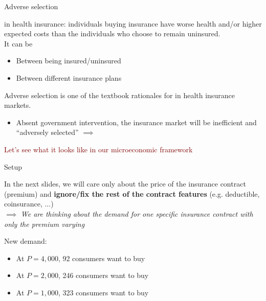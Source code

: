 \begin{frame}{Adverse selection}

     in health insurance:
    individuals buying insurance have worse health and/or higher expected costs than the individuals who choose to remain uninsured.\\
    It can be 
    \begin{itemize}
        \item Between being insured/uninsured
        \item Between different insurance plans
    \end{itemize}
    \vspace{5mm}

    Adverse selection is one of the textbook rationales for  in health insurance markets.
    \begin{itemize}
        \item Absent government intervention, the insurance market will be inefficient and ``adversely selected''
    $\implies$ 
    \end{itemize}
    
\end{frame}
\begin{frame}{}

    \begin{center}
        \Large \textcolor{maroon}{Let's see what it looks like in our microeconomic framework}
    \end{center}
\end{frame}
\begin{frame}{Setup}

    In the next slides, we will care only about the price of 
    the insurance contract (premium) and \textbf{ignore/fix the rest of 
    the contract features} (e.g. deductible, coinsurance, ...)\\
     $\implies$
    \textit{We are thinking about the demand for one specific insurance contract with only the premium varying}\\
    \vspace{5mm}

    New demand:
    \begin{itemize}
        \item At $P=4,000$, 92 consumers want to buy
        \item At $P=2,000$, 246 consumers want to buy
        \item At $P=1,000$, 323 consumers want to buy
    \end{itemize}

\end{frame}
